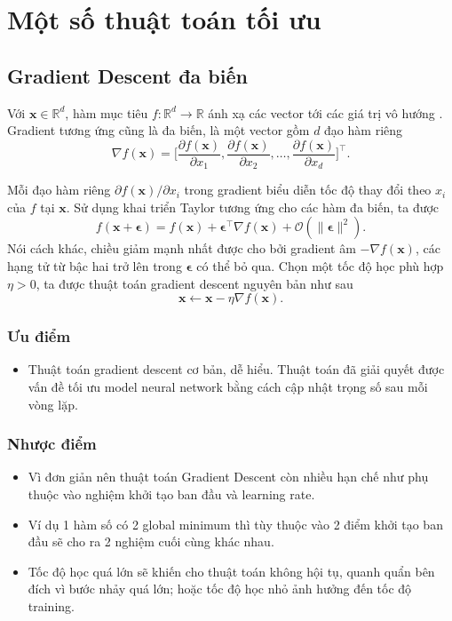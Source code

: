 \documentclass[11pt,oneside,a4paper]{report}
\theoremstyle{definition}
\begin{document}
\section{Một số thuật toán tối ưu}
\subsection{Gradient Descent đa biến}
Với $\mathbf{x} \in \mathbb{R}^d$, hàm mục tiêu $f: \mathbb{R}^d \to \mathbb{R}$ ánh xạ các vector tới các giá trị vô hướng \cite{3}. Gradient tương ứng cũng là đa biến, là một vector gồm  $d$ đạo hàm riêng
$$\nabla f(\mathbf{x}) = \bigg[\frac{\partial f(\mathbf{x})}{\partial x_1}, \frac{\partial f(\mathbf{x})}{\partial x_2}, \ldots, \frac{\partial f(\mathbf{x})}{\partial x_d}\bigg]^\top.$$

Mỗi đạo hàm riêng $\partial f(\mathbf{x})/\partial x_i$ trong gradient biểu diễn tốc độ thay đổi theo $x_i$ của  $f$  tại $\mathbf{x}$. Sử dụng khai triển Taylor tương ứng cho các hàm đa biến, ta được
$$f(\mathbf{x} + \mathbf{\epsilon}) = f(\mathbf{x}) + \mathbf{\epsilon}^\top \nabla f(\mathbf{x}) + \mathcal{O}(\|\mathbf{\epsilon}\|^2).$$
Nói cách khác, chiều giảm mạnh nhất được cho bởi gradient âm $-\nabla f(\mathbf{x})$,  các hạng tử từ bậc hai trở lên trong $\mathbf{\epsilon}$ có thể bỏ qua. Chọn một tốc độ học phù hợp $\eta > 0$, ta được thuật toán gradient descent nguyên bản như sau
$$\mathbf{x} \leftarrow \mathbf{x} - \eta \nabla f(\mathbf{x}).$$
\subsubsection{Ưu điểm}
\begin{itemize}
\item Thuật toán gradient descent cơ bản, dễ hiểu. Thuật toán đã giải quyết được vấn đề tối ưu model neural network bằng cách cập nhật trọng số sau mỗi vòng lặp.
\end{itemize}
\subsubsection{Nhược điểm}
\begin{itemize}
\item Vì đơn giản nên thuật toán Gradient Descent còn nhiều hạn chế như phụ thuộc vào nghiệm khởi tạo ban đầu và learning rate.
\item Ví dụ 1 hàm số có 2 global minimum thì tùy thuộc vào 2 điểm khởi tạo ban đầu sẽ cho ra 2 nghiệm cuối cùng khác nhau.
\item Tốc độ học quá lớn sẽ khiến cho thuật toán không hội tụ, quanh quẩn bên đích vì bước nhảy quá lớn; hoặc tốc độ học nhỏ ảnh hưởng đến tốc độ training.
\end{itemize}
\end{document}
